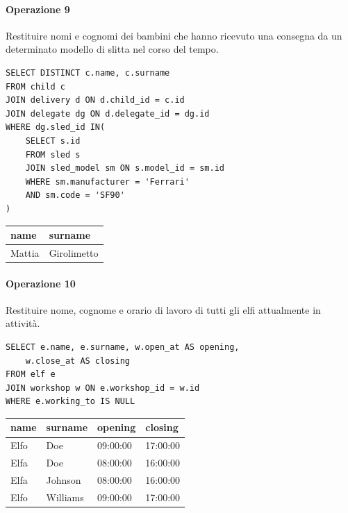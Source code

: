 \documentclass[12pt]{report}
\begin{document}
\paragraph{Operazione 9} Restituire nomi e cognomi dei bambini che hanno ricevuto una consegna da un determinato modello di slitta nel corso del tempo.
\begin{lstlisting}
SELECT DISTINCT c.name, c.surname
FROM child c
JOIN delivery d ON d.child_id = c.id
JOIN delegate dg ON d.delegate_id = dg.id
WHERE dg.sled_id IN(
	SELECT s.id
 	FROM sled s
  	JOIN sled_model sm ON s.model_id = sm.id
	WHERE sm.manufacturer = 'Ferrari' 
 	AND sm.code = 'SF90'
)
\end{lstlisting}
\begin{center}
\begin{tabular}{|l|l|}
\hline
name & surname \\ \hline
Mattia & Girolimetto \\ \hline
\end{tabular}
\end{center}

\paragraph{Operazione 10} Restituire nome, cognome e orario di lavoro di tutti gli elfi attualmente in attività.
\begin{lstlisting}
SELECT e.name, e.surname, w.open_at AS opening, 
	w.close_at AS closing
FROM elf e
JOIN workshop w ON e.workshop_id = w.id
WHERE e.working_to IS NULL
\end{lstlisting}
\begin{center}
\begin{tabular}{|l|l|l|l|}
\hline
name & surname & opening & closing \\ \hline
Elfo & Doe & 09:00:00 & 17:00:00 \\ \hline
Elfa & Doe & 08:00:00 & 16:00:00 \\ \hline
Elfa & Johnson & 08:00:00 & 16:00:00 \\ \hline
Elfo & Williams & 09:00:00 & 17:00:00 \\ \hline
\end{tabular}

\end{center}
\end{document}
